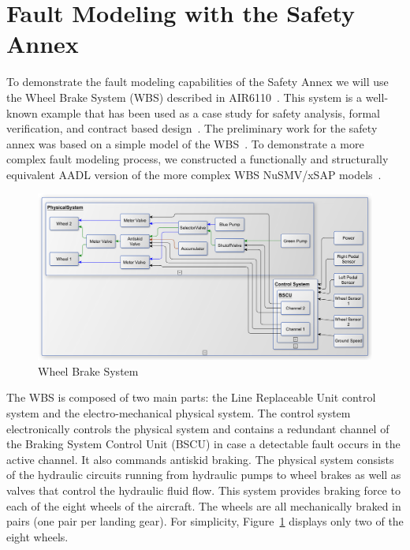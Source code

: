 \section{Fault Modeling with the Safety Annex}
\label{sec:fault_modeling}

To demonstrate the fault modeling capabilities of the Safety Annex we will use the Wheel Brake System (WBS) described in AIR6110~\cite{AIR6110}.  This system is a well-known example that has been used as a case study for safety analysis, formal verification, and contract based design~\cite{DBLP:conf/cav/BozzanoCPJKPRT15, 10.1007/978-3-319-11936-6-7, CAV2015:BoCiGrMa, Joshi05:SafeComp}. The preliminary work for the safety annex was based on a simple model of the WBS~\cite{Stewart17:IMBSA}. To demonstrate a more complex fault modeling process, we constructed a functionally and structurally equivalent AADL version of the more complex WBS NuSMV/xSAP models~\cite{DBLP:conf/cav/BozzanoCPJKPRT15}.    

\begin{figure}[h!]
	\centering
	\includegraphics[trim=0 9 0 5,clip,width=\textwidth]{images/wbs_arch4_diagram.pdf}
	\caption{Wheel Brake System}
	\label{fig:wbs}
\end{figure} 

The WBS is composed of two main parts: the Line Replaceable Unit control system and the electro-mechanical physical system.
The control system electronically controls the physical system and contains a redundant
channel of the Braking System Control Unit (BSCU) in case a detectable fault occurs in the active channel.
 It also commands antiskid braking. %
 The physical system consists of the hydraulic circuits running from hydraulic pumps to wheel brakes as well as valves that control the hydraulic fluid flow. This system provides braking force to each of the eight wheels of the aircraft. The wheels are all mechanically braked in pairs (one pair per landing gear). For simplicity, Figure~\ref{fig:wbs} displays only two of the eight wheels. 

